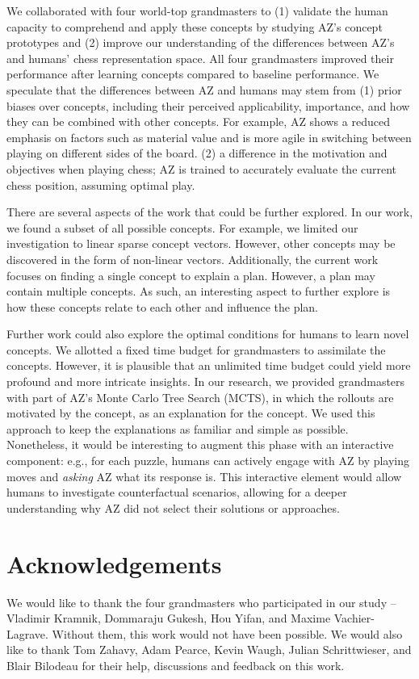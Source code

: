 \documentclass{article}
\begin{document}
We collaborated with four world-top grandmasters to (1) validate the human capacity to comprehend and apply these concepts by studying AZ's concept prototypes and (2) improve our understanding of the differences between AZ's and humans' chess representation space. All four grandmasters improved their performance after learning concepts compared to baseline performance.
We speculate that the differences between AZ and humans may stem from (1) prior biases over concepts, including their perceived applicability, importance, and how they can be combined with other concepts. 
For example, AZ shows a reduced emphasis on factors such as material value and is more agile in switching between playing on different sides of the board.
(2) a difference in the motivation and objectives when playing chess; AZ is trained to accurately evaluate the current chess position, assuming optimal play.

There are several aspects of the work that could be further explored.
In our work, we found a subset of all possible concepts. For example, we limited our investigation to linear sparse concept vectors. However, other concepts may be discovered in the form of non-linear vectors.
Additionally, the current work focuses on finding a single concept to explain a plan. However, a plan may contain multiple concepts. As such, an interesting aspect to further explore is how these concepts relate to each other and influence the plan. 

Further work could also explore the optimal conditions for humans to learn novel concepts. 
We allotted a fixed time budget for grandmasters to assimilate the concepts. However, it is plausible that an unlimited time budget could yield more profound and more intricate insights.
In our research, we provided grandmasters with part of AZ's Monte Carlo Tree Search (MCTS), in which the rollouts are motivated by the concept, as an explanation for the concept. We used this approach to keep the explanations as familiar and simple as possible.
Nonetheless, it would be interesting to augment this phase with an interactive component: e.g., for each puzzle, humans can actively engage with AZ by playing moves and \textit{asking} AZ what its response is. This interactive element would allow humans to investigate counterfactual scenarios, allowing for a deeper understanding why AZ did not select their solutions or approaches.

\section*{Acknowledgements}
We would like to thank the four grandmasters who participated in our study -- Vladimir Kramnik, Dommaraju Gukesh, Hou Yifan, and Maxime Vachier-Lagrave.
Without them, this work would not have been possible. 
We would also like to thank Tom Zahavy, Adam Pearce, Kevin Waugh, Julian Schrittwieser, and Blair Bilodeau for their help, discussions and feedback on this work.
\end{document}
